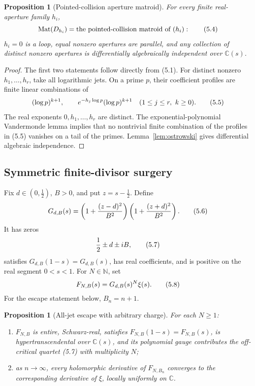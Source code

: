 \documentclass[11pt]{article}
\newtheorem{proposition}[theorem]{Proposition}
\theoremstyle{definition}
\theoremstyle{remark}
\newcommand{\C}{\mathbb C}
\newcommand{\N}{\mathbb N}
\newcommand{\Mat}{\operatorname{Mat}}
\newcommand{\eqtag}[1]{\qquad\text{\upshape(#1)}}
\begin{document}
\begin{proposition}[Pointed-collision aperture matroid]
\label{prop:matroid}
For every finite real-aperture family \(h_i\),
\[
  \Mat(D_{h_i})
  =\text{the pointed-collision matroid of }(h_i):      \eqtag{5.4}
\]
\(h_i=0\) is a loop, equal nonzero apertures are parallel, and any
collection of distinct nonzero apertures is differentially algebraically
independent over \(\C(s)\).
\end{proposition}

\begin{proof}
The first two statements follow directly from (5.1).  For distinct
nonzero \(h_1,\ldots,h_r\), take all logarithmic jets.  On a prime \(p\),
their coefficient profiles are finite linear combinations of
\[
  (\log p)^{k+1},
  \qquad
  e^{-h_j\log p}(\log p)^{k+1}
  \quad(1\leq j\leq r,\ k\geq0).                     \eqtag{5.5}
\]
The real exponents \(0,h_1,\ldots,h_r\) are distinct.  The
exponential-polynomial Vandermonde lemma implies that no nontrivial
finite combination of the profiles in (5.5) vanishes on a tail of the
primes.  Lemma~\ref{lem:ostrowski} gives differential algebraic
independence.
\end{proof}

\subsection{Symmetric finite-divisor surgery}

Fix \(d\in(0,\frac12)\), \(B>0\), and put \(z=s-\frac12\).  Define
\[
  G_{d,B}(s)
  =\left(1+\frac{(z-d)^2}{B^2}\right)
   \left(1+\frac{(z+d)^2}{B^2}\right).               \eqtag{5.6}
\]
It has zeros
\[
  \frac12\pm d\pm iB,                                \eqtag{5.7}
\]
satisfies \(G_{d,B}(1-s)=G_{d,B}(s)\), has real
coefficients, and is positive on the real segment \(0<s<1\).
For \(N\in\N\), set
\[
  F_{N,B}(s)=G_{d,B}(s)^N\xi(s).                     \eqtag{5.8}
\]
For the escape statement below, \(B_n=n+1\).

\begin{proposition}[All-jet escape with arbitrary charge]
\label{prop:escape}
For each \(N\geq1\):
\begin{enumerate}[label=\textup{(\roman*)}]
\item \(F_{N,B}\) is entire, Schwarz-real, satisfies
      \(F_{N,B}(1-s)=F_{N,B}(s)\), is hypertranscendental over
      \(\C(s)\), and its polynomial gauge contributes the
      off-critical quartet (5.7) with multiplicity \(N\);
\item as \(n\to\infty\), every holomorphic derivative of \(F_{N,B_n}\)
      converges to the corresponding derivative of \(\xi\), locally
      uniformly on \(\C\).
\end{enumerate}
\end{proposition}
\end{document}
